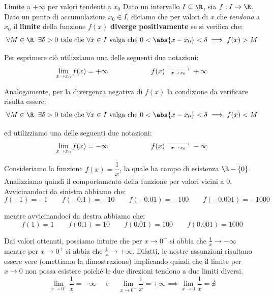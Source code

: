 \documentclass[a4paper, 12pt]{report}
\begin{document}
    \begin{frameddefn}{Limite a $+\infty$ per valori tendenti a $x_0$}
        Dato un intervallo $I \subseteq \R$, sia $f : I \to \R$. Dato un punto di accumulazione $x_0 \in I$, diciamo che per valori di $x$ che \textit{tendono} a $x_0$ il \textbf{limite} della funzione $f(x)$ \textbf{diverge positivamente} se si verifica che:
        \[\forall M \in \R \;\; \exists \delta > 0 \text{ tale che } \forall x \in I \text{ valga che } 0 < \abs{x-x_0} < \delta \implies f(x) > M\]

        Per esprimere ciò utilizziamo una delle seguenti due notazioni:
        \[\lim_{x \to x_0} f(x) = +\infty \qquad\qquad\qquad f(x) \; \substack{\DOTSB\relbar\joinrel\relbar\joinrel\relbar\joinrel\relbar\joinrel\relbar\joinrel\rightarrow \\ x \to x_0} \; +\infty\]
    \end{frameddefn}

    Analogamente, per la divergenza negativa di $f(x)$ la condizione da verificare risulta essere:
    \[\forall M \in \R \;\; \exists \delta > 0 \text{ tale che } \forall x \in I \text{ valga che } 0 < \abs{x-x_0} < \delta \implies f(x) < M\]

    ed utilizziamo una delle seguenti due notazioni:
    \[\lim_{x \to x_0} f(x) = -\infty \qquad\qquad\qquad f(x) \; \substack{\DOTSB\relbar\joinrel\relbar\joinrel\relbar\joinrel\relbar\joinrel\relbar\joinrel\rightarrow \\ x \to x_0} \; -\infty\]
    
    Consideriamo la funzione $f(x) = \dfrac{1}{x}$, la quale ha campo di esistenza $\R-\{0\}$. Analizziamo quindi il comportamento della funzione per valori vicini a $0$. Avvicinandoci da sinistra abbiamo che:
    \[f(-1) = -1 \qquad f(-0.1) = -10 \qquad f(-0.01) = -100 \qquad f(-0.001) = -1000\]

    mentre avvicinandoci da destra abbiamo che:
    \[f(1) = 1 \qquad f(0.1) = 10 \qquad f(0.01) = 100 \qquad f(0.001) = 1000\]

    Dai valori ottenuti, possiamo intuire che per $x \to 0^-$ si abbia che $\frac{1}{x} \to -\infty$ mentre per $x \to 0^+$ si abbia che $\frac{1}{x} \to +\infty$. Difatti, le nostre assunzioni risultano essere vere (omettiamo la dimostrazione) implicando quindi che il limite per $x \to 0$ non possa esistere poiché le due direzioni tendono a due limiti diversi. 
    \[\lim_{x \to 0^-} \frac{1}{x} = -\infty \quad \text{ e } \quad \lim_{x \to 0^+} \frac{1}{x} = +\infty \implies \lim_{x \to 0} \frac{1}{x} = \nexists\]
\end{document}
